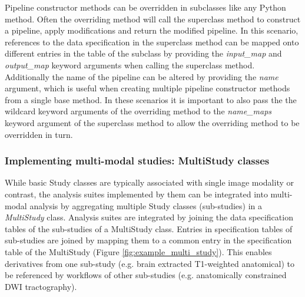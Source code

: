 \documentclass[smallextended]{svjour3}       %
\begin{document}
Pipeline constructor methods can be overridden in subclasses like any Python
method. Often the overriding method will call the superclass method
to construct a pipeline, apply modifications and return the
modified pipeline. In this scenario, references to the data
specification in the superclass method can be mapped onto different
entries in the table of the subclass by providing the \emph{input\_map} and
\emph{output\_map} keyword arguments when calling the superclass method.
Additionally the name of the pipeline can be altered by providing the \emph{name}
argument, which is useful when creating multiple pipeline constructor methods
from a single base method. In these scenarios it is important to
also pass the the wildcard keyword arguments of the overriding method to the
\emph{name\_maps} keyword argument of the superclass method to allow the
overriding method to be overridden in turn.


\subsubsection*{Implementing multi-modal studies: MultiStudy classes}
\label{implementing-multi-modal-studies}

While basic Study classes are typically associated with single image
modality or contrast, the analysis suites implemented by them can be
integrated into multi-modal analysis by aggregating multiple Study
classes (sub-studies) in a \emph{MultiStudy} class. Analysis suites are
integrated by joining the data specification tables of the sub-studies
of a MultiStudy class. Entries in specification tables of sub-studies
are joined by mapping them to a common entry in the specification table
of the MultiStudy (Figure \ref{fig:example_multi_study}). This enables derivatives from one
sub-study (e.g. brain extracted T1-weighted anatomical) to be referenced
by workflows of other sub-studies (e.g. anatomically constrained DWI
tractography).
\end{document}
